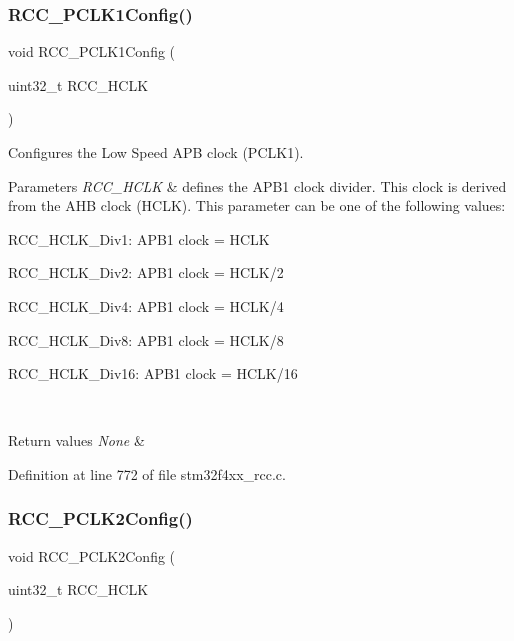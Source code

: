\subsubsection{\texorpdfstring{R\+C\+C\+\_\+\+P\+C\+L\+K1\+Config()}{RCC\_PCLK1Config()}}
{\footnotesize\ttfamily void R\+C\+C\+\_\+\+P\+C\+L\+K1\+Config (\begin{DoxyParamCaption}\item[{uint32\+\_\+t}]{R\+C\+C\+\_\+\+H\+C\+LK }\end{DoxyParamCaption})}



Configures the Low Speed A\+PB clock (P\+C\+L\+K1). 


\begin{DoxyParams}{Parameters}
{\em R\+C\+C\+\_\+\+H\+C\+LK} & defines the A\+P\+B1 clock divider. This clock is derived from the A\+HB clock (H\+C\+LK). This parameter can be one of the following values\+: \begin{DoxyItemize}
\item R\+C\+C\+\_\+\+H\+C\+L\+K\+\_\+\+Div1\+: A\+P\+B1 clock = H\+C\+LK \item R\+C\+C\+\_\+\+H\+C\+L\+K\+\_\+\+Div2\+: A\+P\+B1 clock = H\+C\+L\+K/2 \item R\+C\+C\+\_\+\+H\+C\+L\+K\+\_\+\+Div4\+: A\+P\+B1 clock = H\+C\+L\+K/4 \item R\+C\+C\+\_\+\+H\+C\+L\+K\+\_\+\+Div8\+: A\+P\+B1 clock = H\+C\+L\+K/8 \item R\+C\+C\+\_\+\+H\+C\+L\+K\+\_\+\+Div16\+: A\+P\+B1 clock = H\+C\+L\+K/16 \end{DoxyItemize}
\\
\hline
\end{DoxyParams}

\begin{DoxyRetVals}{Return values}
{\em None} & \\
\hline
\end{DoxyRetVals}


Definition at line 772 of file stm32f4xx\+\_\+rcc.\+c.

\mbox{\label{group___r_c_c_ga09f9c010a4adca9e036da42c2ca6126a}} 
\subsubsection{\texorpdfstring{R\+C\+C\+\_\+\+P\+C\+L\+K2\+Config()}{RCC\_PCLK2Config()}}
{\footnotesize\ttfamily void R\+C\+C\+\_\+\+P\+C\+L\+K2\+Config (\begin{DoxyParamCaption}\item[{uint32\+\_\+t}]{R\+C\+C\+\_\+\+H\+C\+LK }\end{DoxyParamCaption})}



